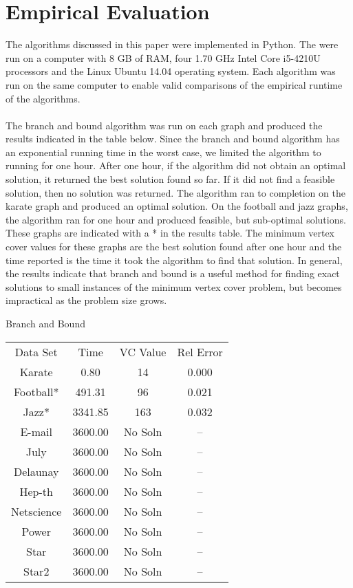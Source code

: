 \documentclass{sig-alternate-05-2015}
\begin{document}
\section{Empirical Evaluation}
The algorithms discussed in this paper were implemented in Python. The were run on a computer with 8 GB of RAM, four 1.70 GHz Intel Core i5-4210U processors and the Linux Ubuntu 14.04 operating system. Each algorithm was run on the same computer to enable valid comparisons of the empirical runtime of the algorithms.
\\
\\
The branch and bound algorithm was run on each graph and produced the results indicated in the table below. Since the branch and bound algorithm has an exponential running time in the worst case, we limited the algorithm to running for one hour. After one hour, if the algorithm did not obtain an optimal solution, it returned the best solution found so far. If it did not find a feasible solution, then no solution was returned. The algorithm ran to completion on the karate graph and produced an optimal solution. On the football and jazz graphs, the algorithm ran for one hour and produced feasible, but sub-optimal solutions. These graphs are indicated with a * in the results table. The minimum vertex cover values for these graphs are the best solution found after one hour and the time reported is the time it took the algorithm to find that solution. In general, the results indicate that branch and bound is a useful method for finding exact solutions to small instances of the minimum vertex cover problem, but becomes impractical as the problem size grows.

\begin{center}
Branch and Bound
\begin{tabular}{c c c c}
Data Set & Time & VC Value & Rel Error \\
Karate & 0.80 & 14 & 0.000 \\
Football* & 491.31 & 96 & 0.021 \\
Jazz* & 3341.85 & 163 & 0.032 \\
E-mail & 3600.00 & No Soln & -- \\
July & 3600.00 & No Soln & -- \\
Delaunay & 3600.00 & No Soln & -- \\
Hep-th & 3600.00 & No Soln & -- \\
Netscience & 3600.00 & No Soln & -- \\
Power & 3600.00 & No Soln & -- \\
Star & 3600.00 & No Soln & -- \\
Star2 & 3600.00 & No Soln & -- \\
\end{tabular}
\end{center}
\end{document}
